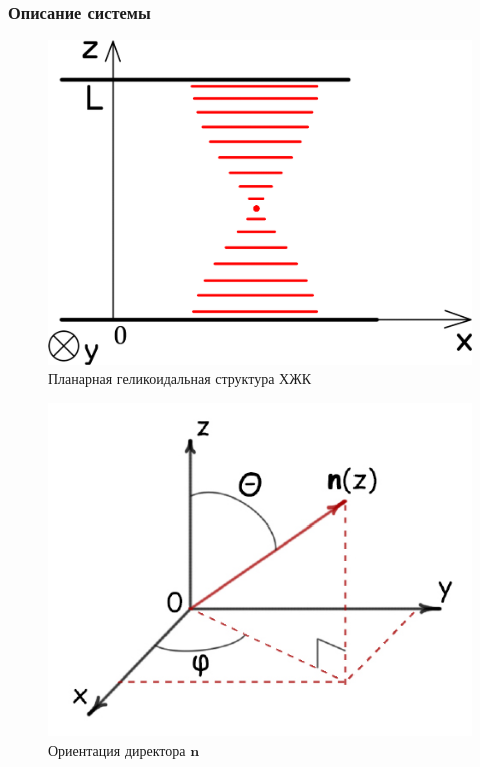 \documentclass[utf8,secheader]{beamer}
\begin{document}
\begin{frame}[t]
\frametitle{Описание системы}
\begin{minipage}{0.49\textwidth}
\begin{figure}[ht]
\centering
\includegraphics[width=\textwidth]{decart.png}
\caption{Планарная геликоидальная структура ХЖК}
\end{figure}
\end{minipage}
\hfill
\begin{minipage}{0.49\textwidth}
\begin{figure}[ht]
\centering
\includegraphics[width=\textwidth]{pic_04.jpg}
\caption{Ориентация директора  $\mathbf{n}$}
\end{figure}
\end{minipage}
\end{frame}
\end{document}
